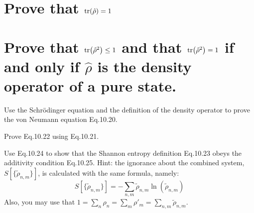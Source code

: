 \documentclass[boxes,pages]{homework}
\makeatletter
\numberwithin{@problem}{section}
\makeatother
\begin{document}
\begin{problem}
\begin{parts}
	\part{Prove that $\tr(\hat{\rho}) = 1$}
	\part{Prove that $\tr(\hat{\rho}^2) \leq 1$ and that $\tr(\hat{\rho}^2) = 1$ if and only if $\hat{\rho}$ is the density operator of a pure state.}
\end{parts}
\end{problem}

\begin{problem}
Use the Schr\"odinger equation and the definition of the density operator to prove the von Neumann equation Eq.10.20.
\end{problem}

\begin{problem}
Prove Eq.10.22 using Eq.10.21.
\end{problem}

\begin{problem}
Use Eq.10.24 to  show that the Shannon entropy definition Eq.10.23 obeys the additivity condition Eq.10.25. Hint: the ignorance about the combined system, $S[\{\tilde{\rho}_{n,m}\}]$, is calculated with the same formula, namely:
\[
	S[\{\tilde{\rho}_{n,m}\}] = -\sum_{n, m}\tilde{\rho}_{n, m}\ln(\tilde{\rho}_{n,m})
\]
Also, you may use that $1 = \sum_n \rho_n = \sum_m\rho'_m = \sum_{n, m}\tilde{\rho}_{n,m}$.
\end{problem}
\begin{solution}
\end{solution}
\end{document}
